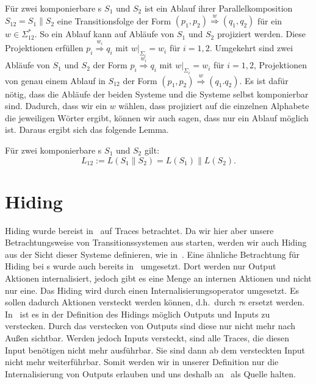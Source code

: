 Für zwei komponierbare \EIO{}s $S_1$ und $S_2$ ist ein Ablauf ihrer
Parallelkomposition $S_{12}=S_1\| S_2$ eine Transitionsfolge der Form $(p_1,p_2)
\overset{w}{\Rightarrow} (q_1,q_2)$ für ein $w\in\Sigma_{12}^*$. So ein Ablauf
kann auf Abläufe von $S_1$ und $S_2$ projiziert werden. Diese Projektionen
erfüllen $p_i \overset{w_i}{\Rightarrow} q_i$ mit $w|_{\Sigma
_i}=w_i$ für $i=1,2$. Umgekehrt sind zwei Abläufe von $S_1$ und $S_2$ der Form
$p_i \overset{w_i}{\Rightarrow} q_i$ mit $w| _{\Sigma _i}= w_i$ für $i=1,2$,
Projektionen von genau einem Ablauf in $S_{12}$ der Form $(p_1,p_2)
\overset{w}{\Rightarrow} (q_1.q_2)$. Es ist dafür nötig, dass die Abläufe der
beiden Systeme und die Systeme selbst komponierbar sind. Dadurch, dass wir
ein $w$ wählen, dass projiziert auf die einzelnen Alphabete die jeweiligen
Wörter ergibt, können wir auch sagen, dass nur ein Ablauf möglich ist. Daraus
ergibt sich das folgende Lemma.

\begin{lem}
  \label{LemmaSprache}
  Für zwei komponierbare \EIO{}s $S_1$ und $S_2$ gilt: \[L_{12} := L(S_1\|S_2) =
  L(S_1)\|L(S_2).\]
\end{lem}

\section{Hiding}

Hiding wurde bereist in~\cite{Chilton2013} auf Traces betrachtet. Da wir hier
aber unsere Betrachtungsweise von Transitionssystemen aus starten, werden
wir auch Hiding aus der Sicht dieser Systeme definieren, wie
in~\cite{Schlosser2012BA}. Eine ähnliche Betrachtung für Hiding bei \EIO{}s
wurde auch bereits in~\cite{Lynch1996} umgesetzt. Dort werden nur Output
Aktionen internalisiert, jedoch gibt es eine Menge an internen Aktionen und
nicht nur eine. Das Hiding wird durch einen Internalisierungsoperator
umgesetzt. Es sollen dadurch Aktionen versteckt werden können, d.h.\ durch
$\tau$s ersetzt werden. In~\cite{Chilton2013} ist es in der Definition des
Hidings möglich Outputs und Inputs zu verstecken. Durch das verstecken von
Outputs sind diese nur nicht mehr nach Außen sichtbar. Werden jedoch Inputs
versteckt, sind alle Traces, die diesen Input benötigen nicht mehr ausführbar.
Sie sind dann ab dem versteckten Input nicht mehr weiterführbar. Somit werden
wir in unserer Definition nur die Internalisierung von Outputs erlauben und uns
deshalb an~\cite{Schlosser2012BA} als Quelle halten.

